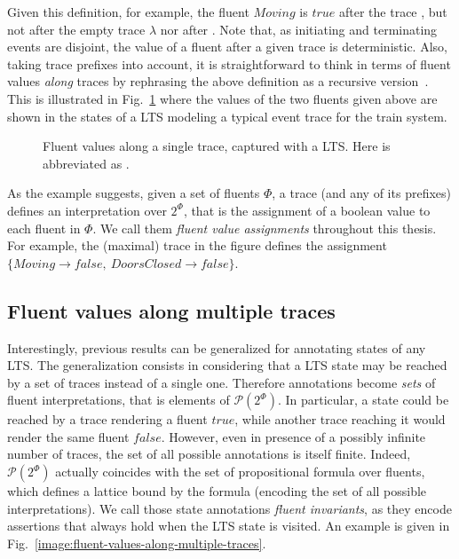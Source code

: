 Given this definition, for example, the fluent $Moving$ is $true$ after the trace , but not after the empty trace $\lambda$ nor after . Note that, as initiating and terminating events are disjoint, the value of a fluent after a given trace is deterministic. Also, taking trace prefixes into account, it is straightforward to think in terms of fluent values \emph{along} traces by rephrasing the above definition as a recursive version~\cite{Damas:2005}. This is illustrated in Fig.~\ref{image:fluent-values-along-a-trace} where the values of the two fluents given above are shown in the states of a LTS modeling a typical event trace for the train system. 

\begin{figure}[H]\centering
{}
\caption{Fluent values along a single trace, captured with a LTS. Here  is abbreviated as .\label{image:fluent-values-along-a-trace}}
\end{figure}

As the example suggests, given a set of fluents $\Phi$, a trace (and any of its prefixes) defines an interpretation over $2^\Phi$, that is the assignment of a boolean value to each fluent in $\Phi$. We call them \emph{fluent value assignments} throughout this thesis. For example, the (maximal) trace in the figure defines the assignment $\{Moving \rightarrow false,~DoorsClosed \rightarrow false\}$. 

\subsection{Fluent values along multiple traces}

Interestingly, previous results can be generalized for annotating states of any LTS. The generalization consists in considering that a LTS state may be reached by a set of traces instead of a single one. Therefore annotations become \emph{sets} of fluent interpretations, that is elements of $\mathcal{P}(2^\Phi)$. In particular, a state could be reached by a trace rendering a fluent $true$, while another trace reaching it would render the same fluent $false$. However, even in presence of a possibly infinite number of traces, the set of all possible annotations is itself finite. Indeed, $\mathcal{P}(2^\Phi)$ actually coincides with the set of propositional formula over fluents, which defines a lattice bound by the  formula (encoding the set of all possible interpretations). We call those state annotations \emph{fluent invariants}, as they encode assertions that always hold when the LTS state is visited. An example is given in Fig.~\ref{image:fluent-values-along-multiple-traces}.

